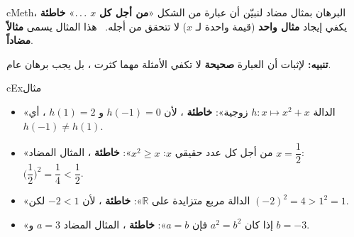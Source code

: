 \documentclass[12pt,a4paper]{article}
\newenvironment{BOX}[2]{\begin{otherlanguage}{english}\begin{arbox}{#1}{#2}}{\end{arbox}\end{otherlanguage}}
\newenvironment{mithal}[1][مثال]{\begin{BOX}{cEx}{#1}}{\end{BOX}}
\newenvironment{tariqa}[1][طريقة]{\begin{BOX}{cMeth}{#1}}{\end{BOX}}
\renewcommand{\ldots}{\mathinner{\ldotp\ldotp\ldotp}}
\newcommand{\R}{\mathbb{R}}
\begin{document}
\begin{tariqa}[البرهان بمثال مضاد]
لنبيّن أن عبارة من الشكل «\textbf{من أجل كل} $x$ $\ldots$» \textbf{خاطئة} ، يكفي إيجاد \textbf{مثال واحد} (قيمة واحدة لـ $x$) لا تتحقق من أجله. \ هذا المثال يسمى \textbf{مثالاً مضاداً}.\par
\textbf{تنبيه:} لإثبات أن العبارة \textbf{صحيحة} لا تكفي الأمثلة مهما كثرت ، بل يجب برهان عام.
\end{tariqa}
\begin{mithal}
\begin{itemize}
\item «الدالة $h:x\mapsto x^2+x$ زوجية»: \textbf{خاطئة} ، لأن $h(-1)=0$ و $h(1)=2$ ، أي $h(-1)\ne h(1)$.
\item «من أجل كل عدد حقيقي $x$: $x^2\ge x$»: \textbf{خاطئة} ، المثال المضاد $x=\dfrac12$: $\Big(\dfrac12\Big)^2=\dfrac14<\dfrac12$.
\item «الدالة مربع متزايدة على $\R$»: \textbf{خاطئة} ، لأن $-2<1$ لكن $(-2)^2=4>1^2=1$.
\item «إذا كان $a^2=b^2$ فإن $a=b$»: \textbf{خاطئة} ، المثال المضاد $a=3$ و $b=-3$.
\end{itemize}
\end{mithal}

\end{document}
